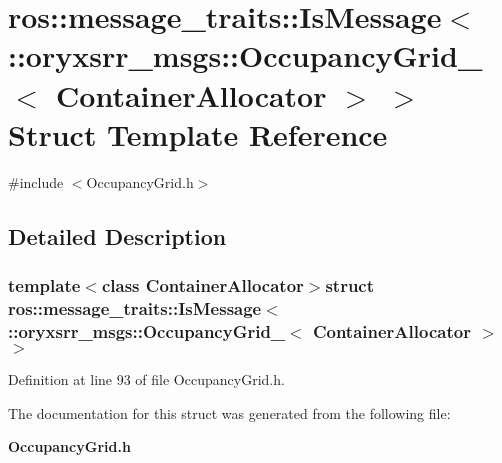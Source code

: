 \section{ros\-:\-:message\-\_\-traits\-:\-:\-Is\-Message$<$ \-:\-:oryxsrr\-\_\-msgs\-:\-:\-Occupancy\-Grid\-\_\-$<$ \-Container\-Allocator $>$ $>$ \-Struct \-Template \-Reference}
\label{structros_1_1message__traits_1_1IsMessage_3_01_1_1oryxsrr__msgs_1_1OccupancyGrid___3_01ContainerAllocator_01_4_01_4}


{\ttfamily \#include $<$\-Occupancy\-Grid.\-h$>$}



\subsection{\-Detailed \-Description}
\subsubsection*{template$<$class Container\-Allocator$>$struct ros\-::message\-\_\-traits\-::\-Is\-Message$<$ \-::oryxsrr\-\_\-msgs\-::\-Occupancy\-Grid\-\_\-$<$ Container\-Allocator $>$ $>$}



\-Definition at line 93 of file \-Occupancy\-Grid.\-h.



\-The documentation for this struct was generated from the following file\-:\begin{DoxyCompactItemize}
\item 
{\bf \-Occupancy\-Grid.\-h}\end{DoxyCompactItemize}
